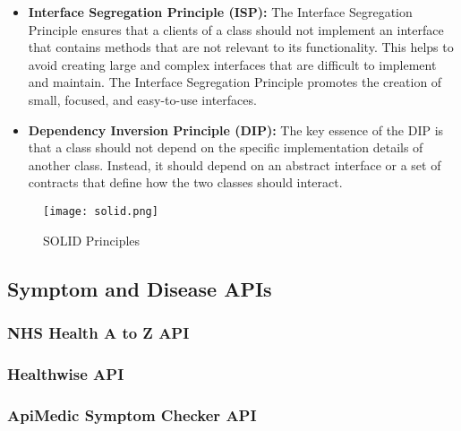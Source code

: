 \begin{itemize}
	\item \textbf{Interface Segregation Principle (ISP):}
	The Interface Segregation Principle ensures that a clients of a class should not implement an interface that contains methods that are not relevant to its functionality. This helps to avoid creating large and complex interfaces that are difficult to implement and maintain. The Interface Segregation Principle promotes the creation of small, focused, and easy-to-use interfaces. 
	
	\item \textbf{Dependency Inversion Principle (DIP):}
	The key essence of the DIP is that a class should not depend on the specific implementation details of another class. Instead, it should depend on an abstract interface or a set of contracts that define how the two classes should interact.
\end{itemize}

\begin{figure}[h]
	\centering
	\texttt{[image: solid.png]}
	\caption[SOLID]{SOLID Principles}
\end{figure}
\subsection{Symptom and Disease APIs}
\subsubsection{NHS Health A to Z API}
\subsubsection{Healthwise API}
\subsubsection{ApiMedic Symptom Checker API}
